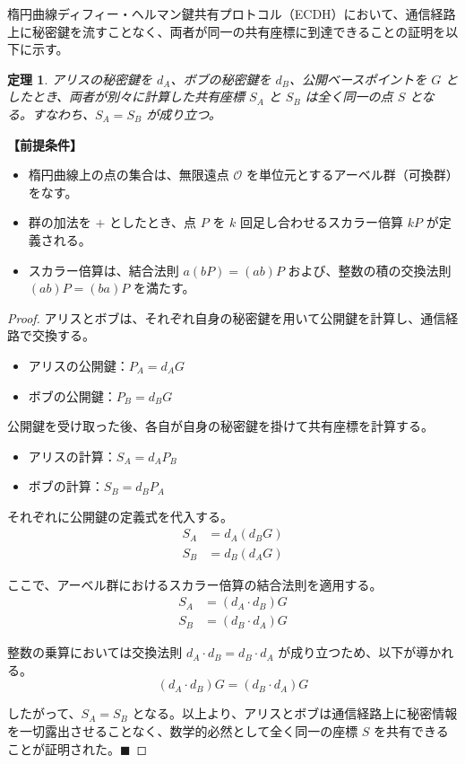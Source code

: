 \documentclass[11pt,a4paper]{ltjsarticle}
\newtheorem{theorem}{定理}
\newtheorem{proof}{証明}
\begin{document}
楕円曲線ディフィー・ヘルマン鍵共有プロトコル（ECDH）において、通信経路上に秘密鍵を流すことなく、両者が同一の共有座標に到達できることの証明を以下に示す。

\begin{theorem}
アリスの秘密鍵を $d_A$、ボブの秘密鍵を $d_B$、公開ベースポイントを $G$ としたとき、両者が別々に計算した共有座標 $S_A$ と $S_B$ は全く同一の点 $S$ となる。すなわち、$S_A = S_B$ が成り立つ。
\end{theorem}

\textbf{【前提条件】}
\begin{itemize}
  \item 楕円曲線上の点の集合は、無限遠点 $\mathcal{O}$ を単位元とするアーベル群（可換群）をなす。
  \item 群の加法を $+$ としたとき、点 $P$ を $k$ 回足し合わせるスカラー倍算 $kP$ が定義される。
  \item スカラー倍算は、結合法則 $a(bP) = (ab)P$ および、整数の積の交換法則 $(ab)P = (ba)P$ を満たす。
\end{itemize}

\begin{proof}
アリスとボブは、それぞれ自身の秘密鍵を用いて公開鍵を計算し、通信経路で交換する。
\begin{itemize}
  \item アリスの公開鍵：$P_A = d_A G$
  \item ボブの公開鍵：$P_B = d_B G$
\end{itemize}

公開鍵を受け取った後、各自が自身の秘密鍵を掛けて共有座標を計算する。
\begin{itemize}
  \item アリスの計算：$S_A = d_A P_B$
  \item ボブの計算：$S_B = d_B P_A$
\end{itemize}

それぞれに公開鍵の定義式を代入する。
\begin{align*}
  S_A &= d_A (d_B G) \\
  S_B &= d_B (d_A G)
\end{align*}

ここで、アーベル群におけるスカラー倍算の結合法則を適用する。
\begin{align*}
  S_A &= (d_A \cdot d_B) G \\
  S_B &= (d_B \cdot d_A) G
\end{align*}

整数の乗算においては交換法則 $d_A \cdot d_B = d_B \cdot d_A$ が成り立つため、以下が導かれる。
\[ (d_A \cdot d_B) G = (d_B \cdot d_A) G \]

したがって、$S_A = S_B$ となる。以上より、アリスとボブは通信経路上に秘密情報を一切露出させることなく、数学的必然として全く同一の座標 $S$ を共有できることが証明された。\hfill $\blacksquare$
\end{proof}
\end{document}

